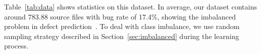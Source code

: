 Table~\ref{tab:data} shows statistics on this dataset. In average, our dataset contains around 783.88 source files with bug rate of 17.4\%, showing the imbalanced problem in defect prediction~\cite{wang2013using, khoshgoftaar2010attribute}. To deal with class imbalance, we use random sampling strategy described in Section~\ref{sec:imbalanced} during the learning process.




